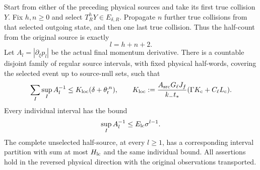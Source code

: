\begin{theorem}\label{thm:lc-local-half}
Start from either of the preceding physical sources and take its first
true collision $Y$.  Fix $h,n\ge0$ and select
$T_R^hY\in E_{\delta,R}$.  Propagate $n$ further true collisions
from that selected outgoing state, and then one last true collision.
Thus the half-count from the original source is exactly
\begin{equation}\label{eq:lc-half-index}
                         l=h+n+2.
\end{equation}
Let $A_l=|\partial_\xi p_l|$ be the actual final momentum derivative.
There is a countable disjoint family of regular source intervals,
with fixed physical half-words, covering the selected event up to
source-null sets, such that
\begin{equation}\label{eq:lc-local-half}
 \sum_I\sup_I A_l^{-1}
     \le K_{\rm loc}(\delta+\theta_{\rm r}^{,n}),\qquad
 K_{\rm loc}:=
 \frac{A_{\rm src}G_\ell J_f}{k_-t_*}
                  (\Gamma K_{\rm c}+C_\ell L_{\rm c}).
\end{equation}
Every individual interval has the bound
\begin{equation}\label{eq:lc-individual}
                \sup_I A_l^{-1}\le E_{\rm lc}\sigma^{l-1}.
\end{equation}
The complete unselected half-source, at every $l\ge1$, has a
corresponding interval partition with sum at most $H_{\rm lc}$ and
the same individual bound.  All assertions hold in the reversed
physical direction with the original observations transported.
\end{theorem}

